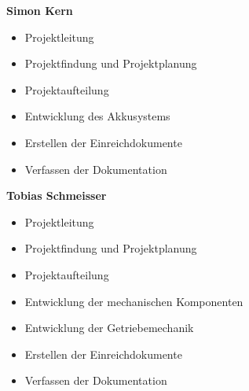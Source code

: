 \newpage

\textbf{Simon Kern}
\begin{itemize}
	\item Projektleitung
	\item Projektfindung und Projektplanung
	\item Projektaufteilung
	\item Entwicklung des Akkusystems
	\item Erstellen der Einreichdokumente
	\item Verfassen der Dokumentation
\end{itemize}
\bigskip

\textbf{Tobias Schmeisser}
\begin{itemize}
	\item Projektleitung
	\item Projektfindung und Projektplanung
	\item Projektaufteilung
	\item Entwicklung der mechanischen Komponenten
	\item Entwicklung der Getriebemechanik
	\item Erstellen der Einreichdokumente	
	\item Verfassen der Dokumentation
\end{itemize}